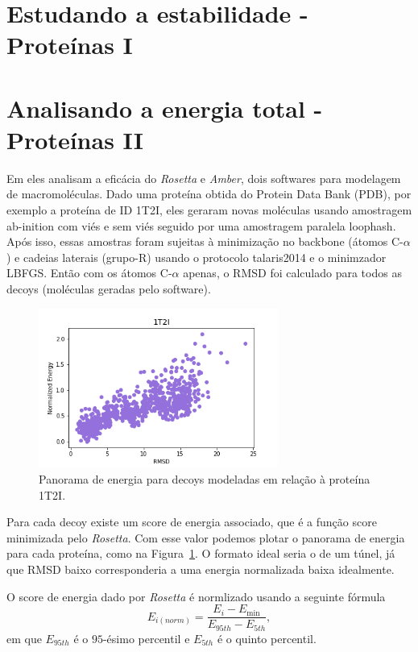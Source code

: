 \section{Estudando a estabilidade - Proteínas I}\label{sec:stabprot}



\section{Analisando a energia total - Proteínas II}\label{sec:predrmsd}

Em \cite{Rubenstein2018} eles analisam a eficácia do \textit{Rosetta} e \textit{Amber}, dois softwares
para modelagem de macromoléculas. Dado uma proteína obtida do Protein Data Bank (PDB), por exemplo a proteína
de ID 1T2I, eles geraram novas moléculas usando amostragem ab-inition com viés e sem viés seguido por
uma amostragem paralela loophash. Após isso, essas amostras foram sujeitas à minimização no
backbone (átomos C-$\alpha$) e cadeias laterais (grupo-R) usando o protocolo talaris2014 e o minimzador
LBFGS. Então com os átomos C-$\alpha$ apenas, o RMSD foi calculado para todos as decoys (moléculas
geradas pelo software).

\begin{figure}[!htbp]
    \centering
    \includegraphics[width=0.7\textwidth]{images/relatorio/1t2i_tunnel.png}
    \caption{Panorama de energia para decoys modeladas em relação à proteína 1T2I.}
    \label{fig:1t2iland}
\end{figure}

Para cada decoy existe um score de energia associado, que é a função score minimizada pelo \textit{Rosetta}.
Com esse valor podemos plotar o panorama de energia para cada proteína, como na Figura~\ref{fig:1t2iland}.
O formato ideal seria o de um túnel, já que RMSD baixo corresponderia a uma energia normalizada baixa idealmente.

O score de energia dado por \textit{Rosetta} é normlizado usando a seguinte fórmula
\begin{equation}
    E_{i(norm)} = \frac{E_i - E_{\min}}{E_{95th} - E_{5th}},
\end{equation}
em que $E_{95th}$ é o $95$-ésimo percentil e $E_{5th}$ é o quinto percentil.

